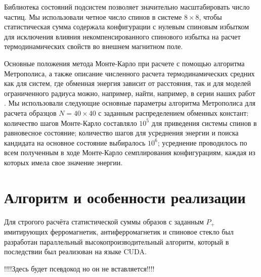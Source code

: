Библиотека состояний подсистем позволяет значительно масштабировать число частиц. Мы использовали четное число спинов в системе $8\times8$, чтобы статистическая сумма содержала конфигурации с нулевым спиновым избытком для исключения влияния некомпенсированного спинового избытка на расчет термодинамических свойств во внешнем магнитном поле.

Основные положения метода Монте-Карло при расчете с помощью алгоритма Метрополиса, а также описание численного расчета термодинамических средних как для систем, где обменная энергия зависит от расстояния, так и для моделей ограниченного радиуса можно, например, найти, например, в серии наших работ  \cite{Shevchenko2017, makarov2019, Shevchenko2022, makarova2023}. Мы использовали следующие основные параметры алгоритма Метрополиса для расчета образцов $N=40\times40$ с заданным распределением обменных констант: количество шагов Монте-Карло составляло $10^5$ для приведения системы спинов в равновесное состояние; количество шагов для усреднения энергии и поиска кандидата на основное состояние выбиралось $10^6$; усреднение проводилось по всем полученным в ходе Монте-Карло семплирования конфигурациям, каждая из которых имела свое значение энергии.

\section{Алгоритм и особенности реализации}

Для строгого расчёта статистической суммы образов с заданным $P_+$ имитирующих ферромагнетик, антиферромагнетик и спиновое стекло был разработан параллельный высокопроизводительный алгоритм, который в последствии был реализован на языке CUDA.

!!!!Здесь будет псевдокод но он не вставляется!!!!

